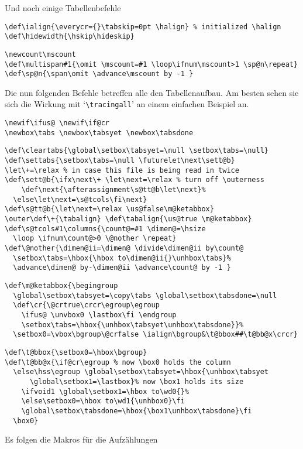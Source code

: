 \begin{appendix}
Und noch einige Tabellenbefehle
\begin{verbatim}
\def\ialign{\everycr={}\tabskip=0pt \halign} % initialized \halign
\def\hidewidth{\hskip\hideskip}
\end{verbatim}
\begin{verbatim}
\newcount\mscount
\def\multispan#1{\omit \mscount=#1 \loop\ifnum\mscount>1 \sp@n\repeat}
\def\sp@n{\span\omit \advance\mscount by -1 }
\end{verbatim}
Die nun folgenden Befehle betreffen alle den Tabellenaufbau. Am besten
sehen sie sich die Wirkung mit `\verb|\tracingall|' an einem einfachen
Beispiel an.
\begin{verbatim}
\newif\ifus@ \newif\if@cr
\newbox\tabs \newbox\tabsyet \newbox\tabsdone
\end{verbatim}
\begin{verbatim}
\def\cleartabs{\global\setbox\tabsyet=\null \setbox\tabs=\null}
\def\settabs{\setbox\tabs=\null \futurelet\next\sett@b}
\let\+=\relax % in case this file is being read in twice
\def\sett@b{\ifx\next\+ \let\next=\relax % turn off \outerness
    \def\next{\afterassignment\s@tt@b\let\next}%
  \else\let\next=\s@tcols\fi\next}
\def\s@tt@b{\let\next=\relax \us@false\m@ketabbox}
\outer\def\+{\tabalign} \def\tabalign{\us@true \m@ketabbox}
\def\s@tcols#1\columns{\count@=#1 \dimen@=\hsize
  \loop \ifnum\count@>0 \@nother \repeat}
\def\@nother{\dimen@ii=\dimen@ \divide\dimen@ii by\count@
  \setbox\tabs=\hbox{\hbox to\dimen@ii{}\unhbox\tabs}%
  \advance\dimen@ by-\dimen@ii \advance\count@ by -1 }
\end{verbatim}
\begin{verbatim}
\def\m@ketabbox{\begingroup
  \global\setbox\tabsyet=\copy\tabs \global\setbox\tabsdone=\null
  \def\cr{\@crtrue\crcr\egroup\egroup
    \ifus@ \unvbox0 \lastbox\fi \endgroup
    \setbox\tabs=\hbox{\unhbox\tabsyet\unhbox\tabsdone}}%
  \setbox0=\vbox\bgroup\@crfalse \ialign\bgroup&\t@bbox##\t@bb@x\crcr}
\end{verbatim}
\begin{verbatim}
\def\t@bbox{\setbox0=\hbox\bgroup}
\def\t@bb@x{\if@cr\egroup % now \box0 holds the column
  \else\hss\egroup \global\setbox\tabsyet=\hbox{\unhbox\tabsyet
      \global\setbox1=\lastbox}% now \box1 holds its size
    \ifvoid1 \global\setbox1=\hbox to\wd0{}%
    \else\setbox0=\hbox to\wd1{\unhbox0}\fi
    \global\setbox\tabsdone=\hbox{\box1\unhbox\tabsdone}\fi
  \box0}
\end{verbatim}
Es folgen die Makros f\"ur die
Aufz\"ahlungen

\end{appendix}
